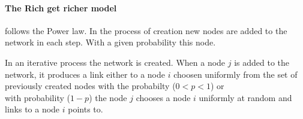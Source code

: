 \paragraph{The Rich get richer model} %
\label{par:the_rich_get_richer_model}
follows the Power law.
In the process of creation new nodes are added to the network in each step.
With a given probability this node.

In an iterative process the network is created.
When a node $j$ is added to the network,
it produces a link either to a node $i$ choosen uniformly from the set of previously created nodes
with the probabilty ($0 < p < 1$) or \\
with probability ($1-p$) the node $j$ chooses a node $i$ uniformly at random
and links to a node $i$ points to.


